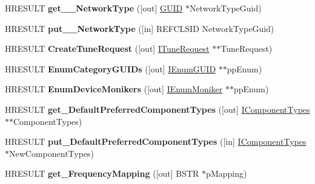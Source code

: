 \begin{DoxyCompactItemize}
H\+R\+E\+S\+U\+LT {\bfseries get\+\_\+\+\_\+\+Network\+Type} (\mbox{[}out\mbox{]} \hyperlink{interface_g_u_i_d}{G\+U\+ID} $\ast$Network\+Type\+Guid)
\item 
\mbox{\label{interface_i_tuning_space_a544eccef52c96d48f98b403fdda7a9fc}} 
H\+R\+E\+S\+U\+LT {\bfseries put\+\_\+\+\_\+\+Network\+Type} (\mbox{[}in\mbox{]} R\+E\+F\+C\+L\+S\+ID Network\+Type\+Guid)
\item 
\mbox{\label{interface_i_tuning_space_a11c518565c44b182fb1fc687093ab06a}} 
H\+R\+E\+S\+U\+LT {\bfseries Create\+Tune\+Request} (\mbox{[}out\mbox{]} \hyperlink{interface_i_tune_request}{I\+Tune\+Request} $\ast$$\ast$Tune\+Request)
\item 
\mbox{\label{interface_i_tuning_space_a841c2814881b1e96e952b627d6a8a7fa}} 
H\+R\+E\+S\+U\+LT {\bfseries Enum\+Category\+G\+U\+I\+Ds} (\mbox{[}out\mbox{]} \hyperlink{interface_i_enum_g_u_i_d}{I\+Enum\+G\+U\+ID} $\ast$$\ast$pp\+Enum)
\item 
\mbox{\label{interface_i_tuning_space_a7b0cc7b2c5ce8bf98cb1fc6f01eaa93c}} 
H\+R\+E\+S\+U\+LT {\bfseries Enum\+Device\+Monikers} (\mbox{[}out\mbox{]} \hyperlink{interface_i_enum_moniker}{I\+Enum\+Moniker} $\ast$$\ast$pp\+Enum)
\item 
\mbox{\label{interface_i_tuning_space_a51969dc8a591de78eb7049f7d67a1e9c}} 
H\+R\+E\+S\+U\+LT {\bfseries get\+\_\+\+Default\+Preferred\+Component\+Types} (\mbox{[}out\mbox{]} \hyperlink{interface_i_component_types}{I\+Component\+Types} $\ast$$\ast$Component\+Types)
\item 
\mbox{\label{interface_i_tuning_space_af8be85f04d8671ac9c3152dfe3463464}} 
H\+R\+E\+S\+U\+LT {\bfseries put\+\_\+\+Default\+Preferred\+Component\+Types} (\mbox{[}in\mbox{]} \hyperlink{interface_i_component_types}{I\+Component\+Types} $\ast$New\+Component\+Types)
\item 
\mbox{\label{interface_i_tuning_space_aea3f8d114f523f712839d3dfb63449a4}} 
H\+R\+E\+S\+U\+LT {\bfseries get\+\_\+\+Frequency\+Mapping} (\mbox{[}out\mbox{]} B\+S\+TR $\ast$p\+Mapping)
\item 

\end{DoxyCompactItemize}
